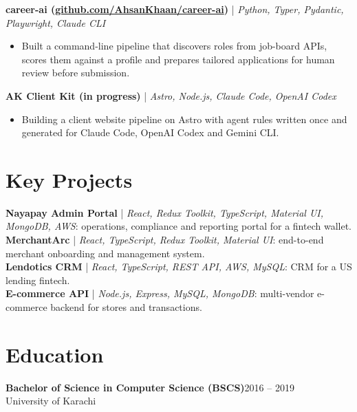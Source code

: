 \documentclass[10.5pt,a4paper]{article}
\newcommand{\project}[2]{\vspace{4pt}\textbf{#1} | \textit{#2}\par}
\begin{document}
\project{career-ai (\href{https://github.com/AhsanKhaan/career-ai}{github.com/AhsanKhaan/career-ai})}{Python, Typer, Pydantic, Playwright, Claude CLI}
\begin{itemize}
  \item Built a command-line pipeline that discovers roles from job-board APIs, scores them against a profile and prepares tailored applications for human review before submission.
\end{itemize}

\project{AK Client Kit (in progress)}{Astro, Node.js, Claude Code, OpenAI Codex}
\begin{itemize}
  \item Building a client website pipeline on Astro with agent rules written once and generated for Claude Code, OpenAI Codex and Gemini CLI.
\end{itemize}

\section{Key Projects}
\textbf{Nayapay Admin Portal} | \textit{React, Redux Toolkit, TypeScript, Material UI, MongoDB, AWS}: operations, compliance and reporting portal for a fintech wallet.\\
\textbf{MerchantArc} | \textit{React, TypeScript, Redux Toolkit, Material UI}: end-to-end merchant onboarding and management system.\\
\textbf{Lendotics CRM} | \textit{React, TypeScript, REST API, AWS, MySQL}: CRM for a US lending fintech.\\
\textbf{E-commerce API} | \textit{Node.js, Express, MySQL, MongoDB}: multi-vendor e-commerce backend for stores and transactions.

\section{Education}
\textbf{Bachelor of Science in Computer Science (BSCS)}\hfill 2016 -- 2019\\
University of Karachi
\end{document}
